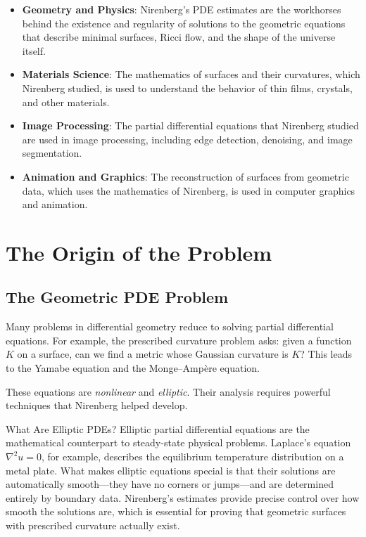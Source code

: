 \begin{itemize}
\item \textbf{Geometry and Physics}: Nirenberg's PDE estimates are the workhorses behind the existence and regularity of solutions to the geometric equations that describe minimal surfaces, Ricci flow, and the shape of the universe itself.

\item \textbf{Materials Science}: The mathematics of surfaces and their curvatures, which Nirenberg studied, is used to understand the behavior of thin films, crystals, and other materials.

\item \textbf{Image Processing}: The partial differential equations that Nirenberg studied are used in image processing, including edge detection, denoising, and image segmentation.

\item \textbf{Animation and Graphics}: The reconstruction of surfaces from geometric data, which uses the mathematics of Nirenberg, is used in computer graphics and animation.
\end{itemize}

\section{The Origin of the Problem}

\subsection{The Geometric PDE Problem}

Many problems in differential geometry reduce to solving partial differential equations. For example, the prescribed curvature problem asks: given a function $K$ on a surface, can we find a metric whose Gaussian curvature is $K$? This leads to the Yamabe equation and the Monge--Amp\`ere equation.

These equations are \emph{nonlinear} and \emph{elliptic}. Their analysis requires powerful techniques that Nirenberg helped develop.

\begin{primer}{What Are Elliptic PDEs?}
Elliptic partial differential equations are the mathematical counterpart to steady-state physical problems. Laplace's equation $\nabla^2 u = 0$, for example, describes the equilibrium temperature distribution on a metal plate. What makes elliptic equations special is that their solutions are automatically smooth---they have no corners or jumps---and are determined entirely by boundary data. Nirenberg's estimates provide precise control over how smooth the solutions are, which is essential for proving that geometric surfaces with prescribed curvature actually exist.
\end{primer}

